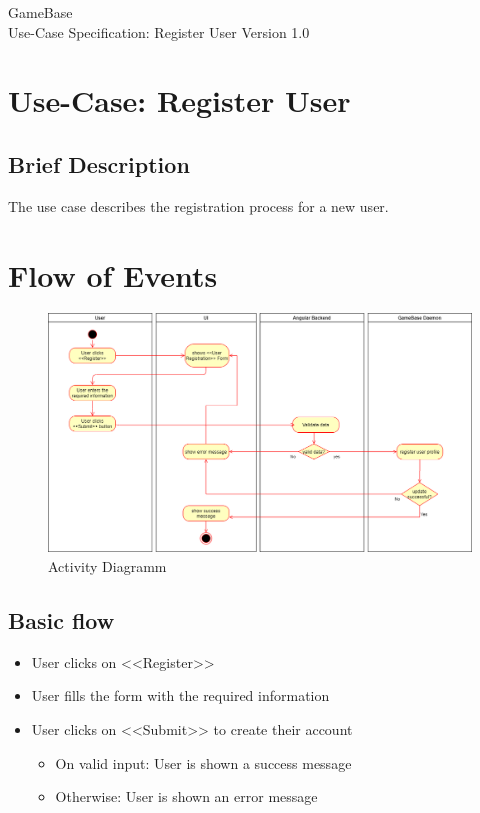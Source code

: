 \documentclass[a4paper,12pt,chapterprefix=false,bibliography=totoc,listof=totoc,book]{scrreprt}
\begin{document}
    \begin{flushright}
        GameBase
        \\
        Use-Case Specification: Register User
        \bigbreak
        Version 1.0
    \end{flushright}

    \tableofcontents

    \chapter{Use-Case: Register User}

    \section{Brief Description}
    The use case describes the registration process for a new user.

    \chapter{Flow of Events}
    \begin{figure}[H]
        \includegraphics[width=\textwidth]{diagramms/UCRegisterUserDiagramm.png}
        \caption{Activity Diagramm}
        \label{fig:ucd}
    \end{figure}
    \section{Basic flow}

    \begin{itemize}
        \item User clicks on <<Register>>
        \item User fills the form with the required information
        \item User clicks on <<Submit>> to create their account
        \begin{itemize}
            \item On valid input: User is shown a success message
            \item Otherwise: User is shown an error message
        \end{itemize}
    \end{itemize}
\end{document}
